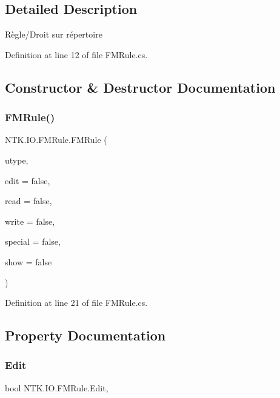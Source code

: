 \subsection{Detailed Description}
Règle/\+Droit sur répertoire 



Definition at line 12 of file F\+M\+Rule.\+cs.



\subsection{Constructor \& Destructor Documentation}
\mbox{\label{class_n_t_k_1_1_i_o_1_1_f_m_rule_ac65bf762f43544a8ae5c9f7782a220b7}} 
\subsubsection{\texorpdfstring{FMRule()}{FMRule()}}
{\footnotesize\ttfamily N\+T\+K.\+I\+O.\+F\+M\+Rule.\+F\+M\+Rule (\begin{DoxyParamCaption}\item[{\mbox{\hyperlink{namespace_n_t_k_a1a2136a0cde3a719c9188a4d515e9f1b}{U\+S\+E\+R\+\_\+\+L\+VL}}}]{utype,  }\item[{bool}]{edit = {\ttfamily false},  }\item[{bool}]{read = {\ttfamily false},  }\item[{bool}]{write = {\ttfamily false},  }\item[{bool}]{special = {\ttfamily false},  }\item[{bool}]{show = {\ttfamily false} }\end{DoxyParamCaption})}



Definition at line 21 of file F\+M\+Rule.\+cs.



\subsection{Property Documentation}
\mbox{\label{class_n_t_k_1_1_i_o_1_1_f_m_rule_a7b01134ca9c95fbf9e8dc0324258af9f}} 
\subsubsection{\texorpdfstring{Edit}{Edit}}
{\footnotesize\ttfamily bool N\+T\+K.\+I\+O.\+F\+M\+Rule.\+Edit\hspace{0.3cm}{\ttfamily [get]}, {\ttfamily [set]}}



